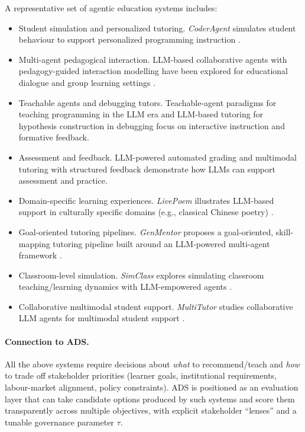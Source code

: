 A representative set of agentic education systems includes:
\begin{itemize}
    \item {Student simulation and personalized tutoring.} \emph{CoderAgent} simulates student behaviour to support personalized programming instruction \cite{coderagent2025}.
    \item {Multi-agent pedagogical interaction.} LLM-based collaborative agents with pedagogy-guided interaction modelling have been explored for educational dialogue and group learning settings \cite{collabAgents2025}.
    \item {Teachable agents and debugging tutors.} Teachable-agent paradigms for teaching programming in the LLM era \cite{teachProg2025} and LLM-based tutoring for hypothesis construction in debugging \cite{ma2023hypocompass} focus on interactive instruction and formative feedback.
    \item {Assessment and feedback.} LLM-powered automated grading \cite{llmGrading2025} and multimodal tutoring with structured feedback \cite{handByHand2025} demonstrate how LLMs can support assessment and practice.
    \item {Domain-specific learning experiences.} \emph{LivePoem} illustrates LLM-based support in culturally specific domains (e.g., classical Chinese poetry) \cite{livepoem2025}.
    \item {Goal-oriented tutoring pipelines.} \emph{GenMentor} proposes a goal-oriented, skill-mapping tutoring pipeline built around an LLM-powered multi-agent framework \cite{wang2025genmentor}.
    \item {Classroom-level simulation.} \emph{SimClass} explores simulating classroom teaching/learning dynamics with LLM-empowered agents \cite{zhang2024simclass}.
    \item {Collaborative multimodal student support.} \emph{MultiTutor} studies collaborative LLM agents for multimodal student support \cite{sun2025multitutor}.
\end{itemize}

\paragraph{Connection to ADS.}
All the above systems require decisions about \emph{what} to recommend/teach and \emph{how} to trade off stakeholder priorities (learner goals, institutional requirements, labour-market alignment, policy constraints).
ADS is positioned as an evaluation layer that can take candidate options produced by such systems and score them transparently across multiple objectives, with explicit stakeholder ``lenses'' and a tunable governance parameter $\tau$.

